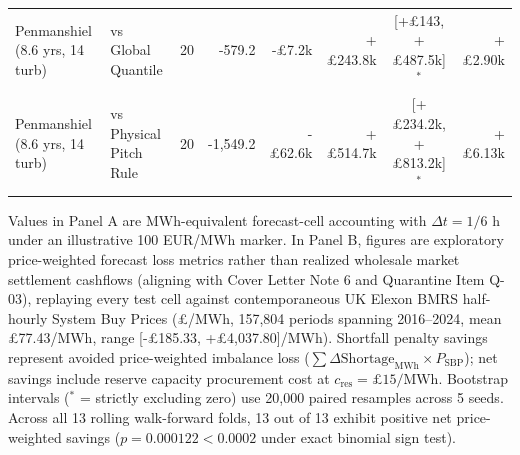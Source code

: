 \documentclass[
  journal]{IEEEtran}
\begin{document}
\begin{table}[!t]
\begin{tabular*}{\textwidth}{@{\extracolsep{\fill}}llcrrrcr@{}}
Penmanshiel (8.6 yrs, 14 turb) & vs Global Quantile & 20 & -579.2 & -£7.2k & +£243.8k & [+£143, +£487.5k]$^*$ & +£2.90k \\
Penmanshiel (8.6 yrs, 14 turb) & vs Physical Pitch Rule & 20 & -1,549.2 & -£62.6k & +£514.7k & [+£234.2k, +£813.2k]$^*$ & +£6.13k \\
\bottomrule
\end{tabular*}
\vspace{1mm}
\raggedright\fontsize{8.0pt}{9.0pt}\selectfont Values in Panel A are MWh-equivalent forecast-cell accounting with $\Delta t=1/6$ h under an illustrative 100 EUR/MWh marker. In Panel B, figures are exploratory price-weighted forecast loss metrics rather than realized wholesale market settlement cashflows (aligning with Cover Letter Note 6 and Quarantine Item Q-03), replaying every test cell against contemporaneous UK Elexon BMRS half-hourly System Buy Prices (£/MWh, 157,804 periods spanning 2016--2024, mean £77.43/MWh, range [-£185.33, +£4,037.80]/MWh). Shortfall penalty savings represent avoided price-weighted imbalance loss ($\sum \Delta\text{Shortage}_{\mathrm{MWh}} \times P_{\mathrm{SBP}}$); net savings include reserve capacity procurement cost at $c_{\mathrm{res}} = £15/\text{MWh}$. Bootstrap intervals ($^*$ = strictly excluding zero) use 20,000 paired resamples across 5 seeds. Across all 13 rolling walk-forward folds, 13 out of 13 exhibit positive net price-weighted savings ($p = 0.000122 < 0.0002$ under exact binomial sign test).
\end{table}
\end{document}

